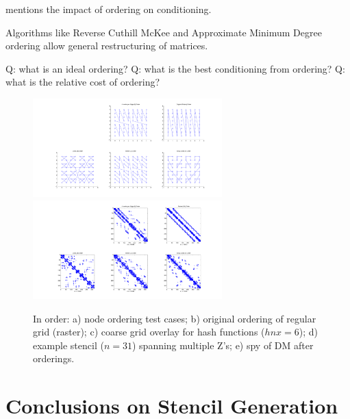 \documentclass{report}
\begin{document}
\cite{Saad2003} mentions the impact of ordering on conditioning.

Algorithms like Reverse Cuthill McKee and Approximate Minimum Degree ordering allow general restructuring of matrices. 


Q: what is an ideal ordering?
Q: what is the best conditioning from ordering?
Q: what is the relative cost of ordering?



\begin{figure}
\centering
\includegraphics[width=0.65\textwidth]{rbffd_methods_content/hashing/node_orderings-eps-converted-to.pdf} \\
\includegraphics[width=0.65\textwidth]{rbffd_methods_content/hashing/spy_regulargrid-eps-converted-to.pdf} 
\caption{In order: a) node ordering test cases; b) original ordering of regular grid (raster); c) coarse grid overlay for hash functions ($hnx = 6$); d) example stencil ($n=31$) spanning multiple Z's; e) spy of DM after orderings. }
\label{fig:orderings}
\end{figure}


\section{Conclusions on Stencil Generation}



\ifstandalone


\end{document}
